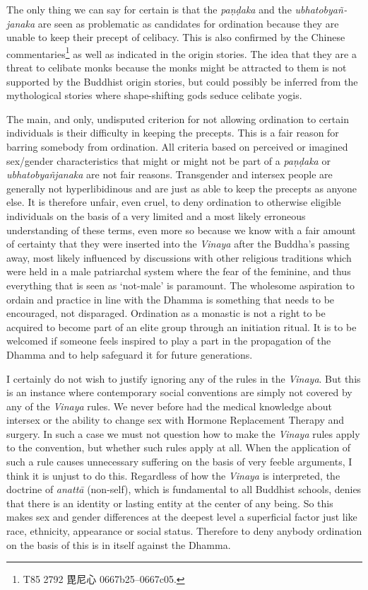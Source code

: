 The only thing we can say for certain is that the {\em paṇḍaka} and the {\em ubhatob­yañ­janaka} are seen as problematic as candidates for ordination because they are unable to keep their precept of celibacy. This is also confirmed by the Chinese commentaries\footnote{T85 2792 毘尼心 0667b25–0667c05.} as well as indicated in the origin stories. The idea that they are a threat to celibate monks because the monks might be attracted to them is not supported by the Buddhist origin stories, but could possibly be inferred from the mythological stories where shape-shifting gods seduce celibate yogis.

The main, and only, undisputed criterion for not allowing ordination to certain individuals is their difficulty in keeping the precepts. This is a fair reason for barring somebody from ordination. All criteria based on perceived or imagined sex/gender characteristics that might or might not be part of a {\em paṇḍaka} or {\em ubhatob­yañ­janaka} are not fair reasons. Transgender and intersex people are generally not hyperlibidinous and are just as able to keep the precepts as anyone else. It is therefore unfair, even cruel, to deny ordination to otherwise eligible individuals on the basis of a very limited and a most likely erroneous understanding of these terms, even more so because we know with a fair amount of certainty that they were inserted into the {\em Vinaya} after the Buddha's passing away, most likely influenced by discussions with other religious traditions which were held in a male patriarchal system where the fear of the feminine, and thus everything that is seen as `not-male' is paramount. The wholesome aspiration to ordain and practice in line with the Dhamma is something that needs to be encouraged, not disparaged. Ordination as a monastic is not a right to be acquired to become part of an elite group through an initiation ritual. It is to be welcomed if someone feels inspired to play a part in the propagation of the Dhamma and to help safeguard it for future generations. 

I certainly do not wish to justify ignoring any of the rules in the {\em Vinaya}. But this is an instance where contemporary social conventions are simply not covered by any of the {\em Vinaya} rules. We never before had the medical knowledge about intersex or the ability to change sex with Hormone Replacement Therapy and surgery. In such a case we must not question how to make the {\em Vinaya} rules apply to the convention, but whether such rules apply at all. When the application of such a rule causes unnecessary suffering on the basis of very feeble arguments, I think it is unjust to do this. Regardless of how the {\em Vinaya} is interpreted, the doctrine of {\em anattā} (non-self), which is fundamental to all Buddhist schools, denies that there is an identity or lasting entity at the center of any being. So this makes sex and gender differences at the deepest level a superficial factor just like race, ethnicity, appearance or social status. Therefore to deny anybody ordination on the basis of this is in itself against the Dhamma.

